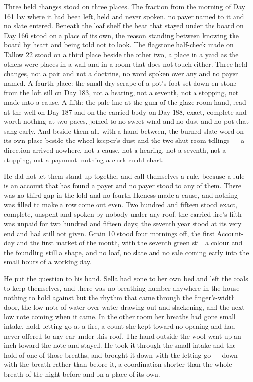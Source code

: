 Three held changes stood on three places. The fraction from the morning of Day 161 lay where it had been left, held and never spoken, no payer named to it and no slate entered. Beneath the loaf shelf the beat that stayed under the board on Day 166 stood on a place of its own, the reason standing between knowing the board by heart and being told not to look. The flagstone half-check made on Tallow 22 stood on a third place beside the other two, a place in a yard as the others were places in a wall and in a room that does not touch either. Three held changes, not a pair and not a doctrine, no word spoken over any and no payer named. A fourth place: the small dry scrape of a pot's foot set down on stone from the loft sill on Day 183, not a hearing, not a seventh, not a stopping, not made into a cause. A fifth: the pale line at the gum of the glaze-room hand, read at the well on Day 187 and on the carried body on Day 188, exact, complete and worth nothing at two paces, joined to no sweet wind and no dust and no pot that sang early. And beside them all, with a hand between, the burned-slate word on its own place beside the wheel-keeper's dust and the two shut-room tellings --- a direction arrived nowhere, not a cause, not a hearing, not a seventh, not a stopping, not a payment, nothing a clerk could chart.

He did not let them stand up together and call themselves a rule, because a rule is an account that has found a payer and no payer stood to any of them. There was no third gap in the fold and no fourth likeness made a cause, and nothing was filled to make a row come out even. Two hundred and fifteen stood exact, complete, unspent and spoken by nobody under any roof; the carried fire's fifth was unpaid for two hundred and fifteen days; the seventh year stood at its very end and had still not given. Grain 10 stood four mornings off, the first Account-day and the first market of the month, with the seventh green still a colour and the foundling still a shape, and no loaf, no slate and no sale coming early into the small hours of a working day.

\scenebreak

He put the question to his hand. Sella had gone to her own bed and left the coals to keep themselves, and there was no breathing number anywhere in the house --- nothing to hold against but the rhythm that came through the finger's-width door, the low note of water over water drawing out and slackening, and the next low note coming when it came. In the other room her breaths had gone small intake, hold, letting go at a fire, a count she kept toward no opening and had never offered to any ear under this roof. The hand outside the wool went up an inch toward the note and stayed. He took it through the small intake and the hold of one of those breaths, and brought it down with the letting go --- down with the breath rather than before it, a coordination shorter than the whole breath of the night before and on a place of its own.

